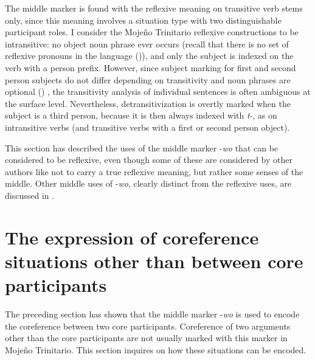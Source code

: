\documentclass[output=paper]{langscibook}
\begin{document}
The middle marker is found with the reflexive meaning on transitive verb stems only, since this meaning involves a situation type with two distinguishable participant roles. I consider the Mojeño Trinitario reflexive constructions to be intransitive: no object noun phrase ever occurs (recall that there is no set of reflexive pronouns in the language ()), and only the subject is indexed on the verb with a person prefix. However, since subject marking for first and second person subjects do not differ depending on transitivity and noun phrases are optional () , the transitivity analysis of individual sentences is often ambiguous at the surface level. Nevertheless, detransitivization is overtly marked when the subject is a third person, because it is then always indexed with \textit{t}-, as on intransitive verbs (and transitive verbs with a first or second person object).



This section has described the uses of the middle marker -\textit{wo} that can be considered to be reflexive, even though some of these are considered by other authors like \citet{Kemmer1993} not to carry a true reflexive meaning, but rather some senses of the middle. Other middle uses of -\textit{wo}, clearly distinct from the reflexive uses, are discussed in .


\section{The expression of coreference situations other than between core participants}
\label{sec:Rose:4}

The preceding section has shown that the middle marker -\textit{wo} is used to encode the coreference between two core participants. Coreference of two arguments other than the core participants are not usually marked with this marker in Mojeño Trinitario. This section inquires on how these situations can be encoded.
\end{document}
